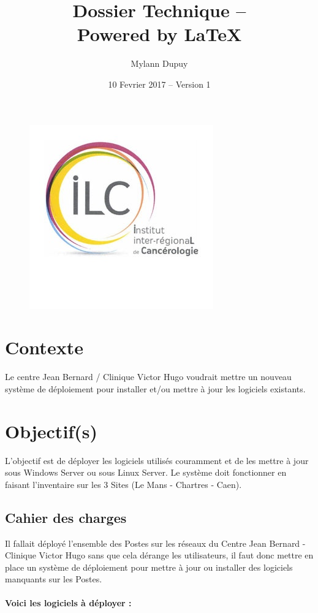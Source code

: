 \documentclass[11pt,a4paper,oneside]{article}
\author{Mylann Dupuy}
\title{Dossier Technique --  \\ Powered by \LaTeX}
\date{10 Fevrier 2017 -- Version 1}
\begin{document}
\maketitle
\begin{figure}[hbtp]
\centering
\includegraphics[scale=1]{Script/cjb.jpg}
\end{figure}
\newpage
\tableofcontents
\newpage
\setcounter{page}{3}
\section{Contexte}
Le centre Jean Bernard / Clinique Victor Hugo voudrait mettre un nouveau système de déploiement pour installer et/ou mettre à jour les logiciels existants.

\section{Objectif(s)}
L'objectif est de déployer les logiciels utilisés couramment et de les mettre à jour sous Windows Server ou sous Linux Server. Le système doit fonctionner en faisant l'inventaire sur les 3 Sites (Le Mans - Chartres - Caen). 

\subsection{Cahier des charges}
Il fallait déployé l'ensemble des Postes sur les réseaux du Centre Jean Bernard - Clinique Victor Hugo sans que cela dérange les utilisateurs, il faut donc mettre en place un système de déploiement pour mettre à jour ou installer des logiciels manquants sur les Postes.\\ \\
\textbf{Voici les logiciels à déployer :}\\
\end{document}
